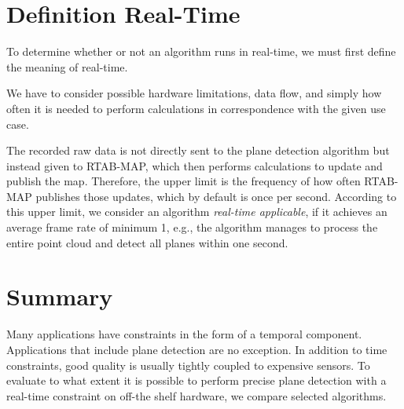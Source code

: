 \documentclass[main.tex]{subfiles}
\begin{document}
\section{Definition Real-Time}\label{sec:realtime}
To determine whether or not an algorithm runs in real-time, we must first define the meaning of real-time.

We have to consider possible hardware limitations, data flow, and simply
how often it is needed to perform calculations in correspondence with the given use case.

The recorded raw data is not directly sent to the plane detection algorithm but instead given to RTAB-MAP, which then performs
calculations to update and publish the map.
Therefore, the upper limit is the frequency of how often RTAB-MAP publishes those updates, which by default is once per second.
According to this upper limit, we consider an algorithm \textit{real-time applicable}, if it achieves an average frame
rate of minimum 1, e.g., the algorithm manages to process the entire point cloud and detect all planes within one second.


\section{Summary}
Many applications have constraints in the form of a temporal component. Applications that include plane detection
are no exception. In addition to time constraints, good quality is usually tightly coupled to expensive sensors.
To evaluate to what extent it is possible to perform precise plane detection with a real-time constraint on off-the shelf hardware,
we compare selected algorithms.
\end{document}
